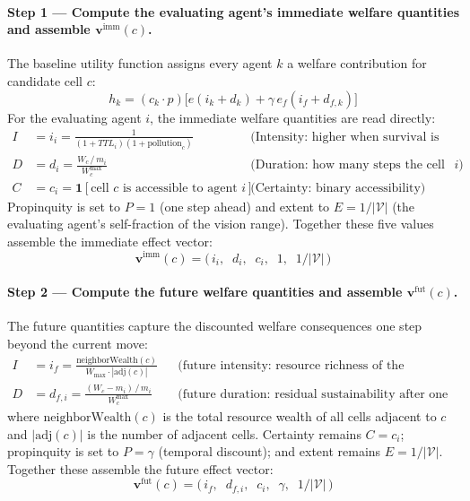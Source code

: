 \documentclass{icsthesis}
\begin{document}
\begin{mainmatter}
\paragraph{Step 1 --- Compute the evaluating agent’s immediate welfare quantities and assemble $\mathbf{v}^{\mathrm{imm}}(c)$.}
The baseline utility function assigns every agent $k$ a welfare contribution for candidate cell $c$:
\[
h_k = (c_k \cdot p)\bigl[e(i_k + d_k) + \gamma\, e_f(i_f + d_{f,k})\bigr]
\]
For the evaluating agent $i$, the immediate welfare quantities are read directly:
\begin{align*}
I &= i_i = \frac{1}{(1 + TTL_i)(1 + \mathrm{pollution}_c)} & &\text{(Intensity: higher when survival is more urgent)} \\
D &= d_i = \frac{W_c\,/\,m_i}{W_c^{\max}} & &\text{(Duration: how many steps the cell sustains agent }i\text{)} \\
C &= c_i = \mathbf{1}[\text{cell }c\text{ is accessible to agent }i] & &\text{(Certainty: binary accessibility)}
\end{align*}
Propinquity is set to $P = 1$ (one step ahead) and extent to $E = 1/|\mathcal{V}|$ (the evaluating agent’s self-fraction of the vision range). Together these five values assemble the immediate effect vector:
\[
\mathbf{v}^{\mathrm{imm}}(c) = \bigl(\,i_i,\;\; d_i,\;\; c_i,\;\; 1,\;\; 1/|\mathcal{V}|\,\bigr)
\]

\paragraph{Step 2 --- Compute the future welfare quantities and assemble $\mathbf{v}^{\mathrm{fut}}(c)$.}
The future quantities capture the discounted welfare consequences one step beyond the current move:
\begin{align*}
I &= i_f = \frac{\mathrm{neighborWealth}(c)}{W_{\max} \cdot |\mathrm{adj}(c)|} & &\text{(future intensity: resource richness of the adjacent cells)} \\
D &= d_{f,i} = \frac{(W_c - m_i)\,/\,m_i}{W_c^{\max}} & &\text{(future duration: residual sustainability after one step)}
\end{align*}
where $\mathrm{neighborWealth}(c)$ is the total resource wealth of all cells adjacent to $c$ and $|\mathrm{adj}(c)|$ is the number of adjacent cells. Certainty remains $C = c_i$; propinquity is set to $P = \gamma$ (temporal discount); and extent remains $E = 1/|\mathcal{V}|$. Together these assemble the future effect vector:
\[
\mathbf{v}^{\mathrm{fut}}(c) = \bigl(\,i_f,\;\; d_{f,i},\;\; c_i,\;\; \gamma,\;\; 1/|\mathcal{V}|\,\bigr)
\]


\end{mainmatter}
\end{document}
